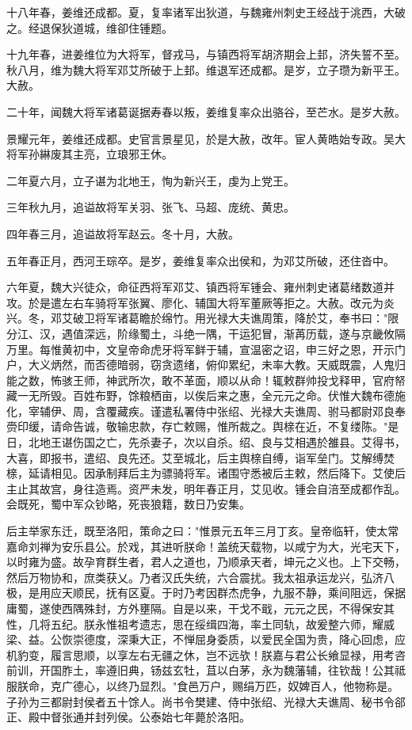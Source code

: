 \documentclass[12pt,UTF8]{ctexbook}
\begin{document}
十八年春，姜维还成都。夏，复率诸军出狄道，与魏雍州刺史王经战于洮西，大破之。经退保狄道城，维卻住锺题。

十九年春，进姜维位为大将军，督戎马，与镇西将军胡济期会上邽，济失誓不至。秋八月，维为魏大将军邓艾所破于上邽。维退军还成都。是岁，立子瓒为新平王。大赦。

二十年，闻魏大将军诸葛诞据寿春以叛，姜维复率众出骆谷，至芒水。是岁大赦。

景耀元年，姜维还成都。史官言景星见，於是大赦，改年。宦人黄皓始专政。吴大将军孙綝废其主亮，立琅邪王休。

二年夏六月，立子谌为北地王，恂为新兴王，虔为上党王。

三年秋九月，追谥故将军关羽、张飞、马超、庞统、黄忠。

四年春三月，追谥故将军赵云。冬十月，大赦。

五年春正月，西河王琮卒。是岁，姜维复率众出侯和，为邓艾所破，还住沓中。

六年夏，魏大兴徒众，命征西将军邓艾、镇西将军锺会、雍州刺史诸葛绪数道并攻。於是遣左右车骑将军张翼、廖化、辅国大将军董厥等拒之。大赦。改元为炎兴。冬，邓艾破卫将军诸葛瞻於绵竹。用光禄大夫谯周策，降於艾，奉书曰："限分江、汉，遇值深远，阶缘蜀土，斗绝一隅，干运犯冒，渐苒历载，遂与京畿攸隔万里。每惟黄初中，文皇帝命虎牙将军鲜于辅，宣温密之诏，申三好之恩，开示门户，大义炳然，而否德暗弱，窃贪遗绪，俯仰累纪，未率大教。天威既震，人鬼归能之数，怖骇王师，神武所次，敢不革面，顺以从命！辄敕群帅投戈释甲，官府帑藏一无所毁。百姓布野，馀粮栖亩，以俟后来之惠，全元元之命。伏惟大魏布德施化，宰辅伊、周，含覆藏疾。谨遣私署侍中张绍、光禄大夫谯周、驸马都尉邓良奉赍印缓，请命告诚，敬输忠款，存亡敕赐，惟所裁之。舆榇在近，不复缕陈。"是日，北地王谌伤国之亡，先杀妻子，次以自杀。绍、良与艾相遇於雒县。艾得书，大喜，即报书，遣绍、良先还。艾至城北，后主舆榇自缚，诣军垒门。艾解缚焚榇，延请相见。因承制拜后主为骠骑将军。诸围守悉被后主敕，然后降下。艾使后主止其故宫，身往造焉。资严未发，明年春正月，艾见收。锺会自涪至成都作乱。会既死，蜀中军众钞略，死丧狼籍，数日乃安集。

后主举家东迁，既至洛阳，策命之曰："惟景元五年三月丁亥。皇帝临轩，使太常嘉命刘禅为安乐县公。於戏，其进听朕命！盖统天载物，以咸宁为大，光宅天下，以时雍为盛。故孕育群生者，君人之道也，乃顺承天者，坤元之义也。上下交畅，然后万物协和，庶类获乂。乃者汉氏失统，六合震扰。我太祖承运龙兴，弘济八极，是用应天顺民，抚有区夏。于时乃考因群杰虎争，九服不静，乘间阻远，保据庸蜀，遂使西隅殊封，方外壅隔。自是以来，干戈不戢，元元之民，不得保安其性，几将五纪。朕永惟祖考遗志，思在绥缉四海，率土同轨，故爰整六师，耀威梁、益。公恢崇德度，深秉大正，不惮屈身委质，以爱民全国为贵，降心回虑，应机豹变，履言思顺，以享左右无疆之休，岂不远欤！朕嘉与君公长飨显禄，用考咨前训，开国胙土，率遵旧典，钖兹玄牡，苴以白茅，永为魏藩辅，往钦哉！公其祗服朕命，克广德心，以终乃显烈。"食邑万户，赐绢万匹，奴婢百人，他物称是。子孙为三都尉封侯者五十馀人。尚书令樊建、侍中张绍、光禄大夫谯周、秘书令郤正、殿中督张通并封列侯。公泰始七年薨於洛阳。
\end{document}
